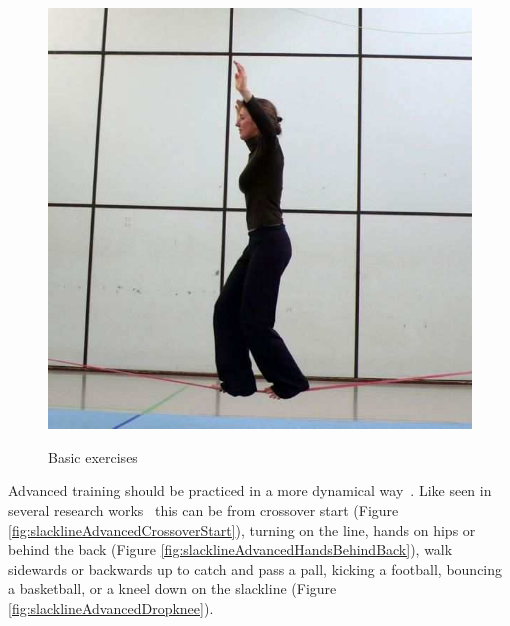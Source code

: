 \begin{figure}[htb]
\begin{minipage}[t]{0.33\linewidth}
		\includegraphics[width=1\linewidth]{Pictures/slacklineBasicBothFeet}
		\label{fig:slacklineBasicBothFeet}
	\end{minipage}
	\caption{Basic exercises~\cite{Kroiss2007-ab}}
	\label{fig:basicExercises}
\end{figure}

Advanced training should be practiced in a more dynamical way~\cite{Thomann2013-aa}. Like seen in several research works~\cite{Donath2013-kk, Donath2016-gm, Granacher2010-ow, Keller2012-xh, Pfusterschmied2013-yy} this can be from crossover start (Figure \ref{fig:slacklineAdvancedCrossoverStart}), turning on the line, hands on hips or behind the back (Figure \ref{fig:slacklineAdvancedHandsBehindBack}), walk sidewards or backwards up to catch and pass a pall, kicking a football, bouncing a basketball, or a kneel down on the slackline (Figure \ref{fig:slacklineAdvancedDropknee}).

